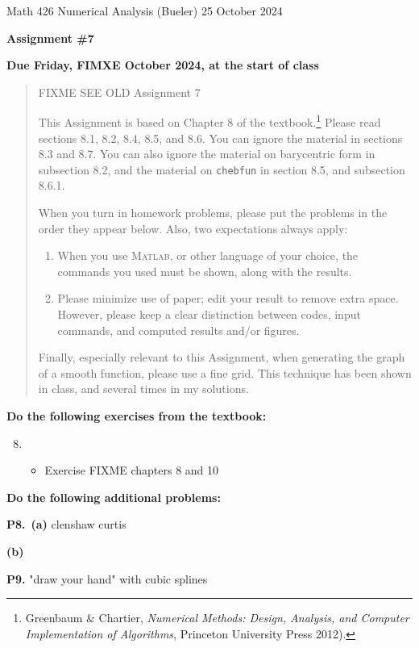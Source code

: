 \documentclass[12pt]{amsart}
\newcommand{\Matlab}{\textsc{Matlab}\xspace}
\newcommand{\prob}[1]{\bigskip\noindent\textbf{#1.}\quad }
\newcommand{\epart}[1]{\medskip\noindent\textbf{(#1)}\quad }
\newcommand{\ppart}[1]{\,\textbf{(#1)}\quad }
\begin{document}
\scriptsize \noindent Math 426 Numerical Analysis (Bueler) \hfill 25 October 2024
\normalsize

\medskip\bigskip

\Large\centerline{\textbf{Assignment \#7}}
\large
\bigskip

\centerline{\textbf{Due Friday, FIMXE October 2024, at the start of class}}
\medskip
\normalsize

\thispagestyle{empty}

\begin{quote}
{\small
FIXME SEE OLD Assignment 7

This Assignment is based on Chapter 8 of the textbook.\footnote{Greenbaum \& Chartier, \emph{Numerical Methods: Design, Analysis, and Computer Implementation of Algorithms}, Princeton University Press 2012).} Please read sections 8.1, 8.2, 8.4, 8.5, and 8.6.  You can ignore the material in sections 8.3 and 8.7.  You can also ignore the material on barycentric form in subsection 8.2, and the material on \texttt{chebfun} in section 8.5, and subsection 8.6.1.

\medskip
\noindent When you turn in homework problems, please put the problems in the order they appear below.  Also, two expectations always apply:
\renewcommand{\labelenumi}{\arabic{enumi}.\,}
\begin{enumerate}
\item When you use \Matlab, or other language of your choice, the commands you used must be shown, along with the results.
\item Please minimize use of paper; edit your result to remove extra space.  However, please keep a clear distinction between codes, input commands, and computed results and/or figures.
\end{enumerate}
}

\medskip
\noindent Finally, especially relevant to this Assignment, when generating the graph of a smooth function, please use a fine grid.  This technique has been shown in class, and several times in my solutions.
\end{quote}

\bigskip
\noindent \textbf{Do the following exercises from the textbook:}

\medskip
\renewcommand{\labelenumi}{{\footnotesize\underline{\textsc{Chapter \arabic{enumi}}}}}
\begin{enumerate}
\setcounter{enumi}{7}
\item ~
    \begin{itemize}
    \item Exercise FIXME chapters 8 and 10
    \end{itemize}
\end{enumerate}

\bigskip
\noindent \textbf{Do the following additional problems:}

\prob{P8}  \ppart{a} clenshaw curtis

\epart{b}  

\prob{P9}  "draw your hand" with cubic splines
\end{document}
